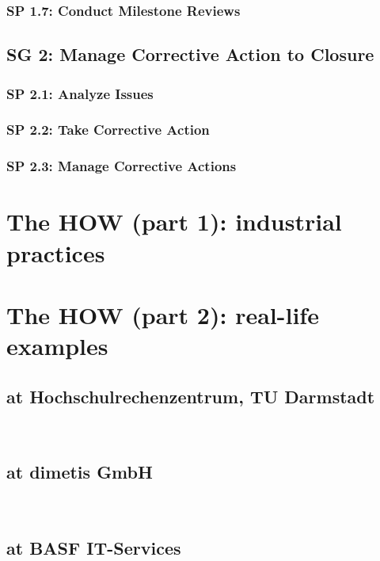 \documentclass[accentcolor=tud10d]{tudbeamer}
\newcommand{\strong}[1]{\textaccentcolor{\textsf{\textbf{#1}}}}
\newenvironment{secframe}{\begin{frame}{\insertsectionhead\\\strong{\insertsubsectionhead}}}{\end{frame}}
\begin{document}
\subsubsection{SP 1.7: Conduct Milestone Reviews}

\subsection{SG 2: Manage Corrective Action to Closure}

\subsubsection{SP 2.1: Analyze Issues}

\subsubsection{SP 2.2: Take Corrective Action}

\subsubsection{SP 2.3: Manage Corrective Actions}

\section{The HOW (part 1): industrial practices}

\section{The HOW (part 2): real-life examples}

\subsection{at Hochschulrechenzentrum, TU Darmstadt}
\begin{secframe}

\end{secframe}

\subsection{at dimetis GmbH}
\begin{secframe}

\end{secframe}

\subsection{at BASF IT-Services}
\begin{secframe}

\end{secframe}
\end{document}

